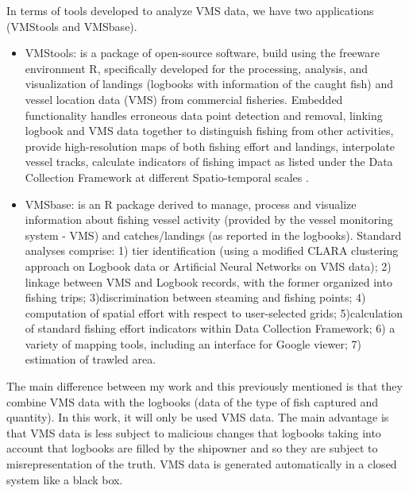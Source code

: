 In terms of tools developed to analyze VMS data, we have two applications (VMStools and VMSbase).
\begin{itemize}
\item    VMStools: is a package of open-source software, build using the freeware environment R, specifically developed for the processing, analysis, and visualization of landings (logbooks with information of the caught fish) and vessel location data (VMS) from commercial fisheries. Embedded functionality handles erroneous data point detection and removal, linking logbook and VMS data together to distinguish fishing from other activities, provide high-resolution maps of both fishing effort and landings, interpolate vessel tracks, calculate indicators of fishing impact as listed under the Data Collection Framework at different Spatio-temporal scales \cite{DeporteVMStools}.


\item    VMSbase: is an R package derived to manage, process and visualize information about fishing vessel activity (provided by the vessel monitoring system - VMS) and catches/landings (as reported in the logbooks).
Standard analyses comprise: 1) tier identification (using a modified CLARA clustering approach on Logbook data or Artificial Neural
Networks on VMS data); 2) linkage between VMS and Logbook records, with the former organized into fishing trips; 3)discrimination between steaming and fishing points; 4) computation of spatial effort with respect to user-selected grids; 5)calculation of standard fishing effort indicators within Data Collection Framework; 6) a variety of mapping tools, including an interface for Google viewer; 7) estimation of trawled area\cite{RussoVMSbase}.
\end{itemize}


The main difference between my work and this previously mentioned is that they combine VMS data with the logbooks (data of the type of fish captured and quantity).
In this work, it will only be used VMS data. 
The main advantage is that VMS data is less subject to malicious changes that logbooks taking into account that logbooks are filled by the shipowner and so they are subject to misrepresentation of the truth. VMS data is generated automatically in a closed system like a black box. 


